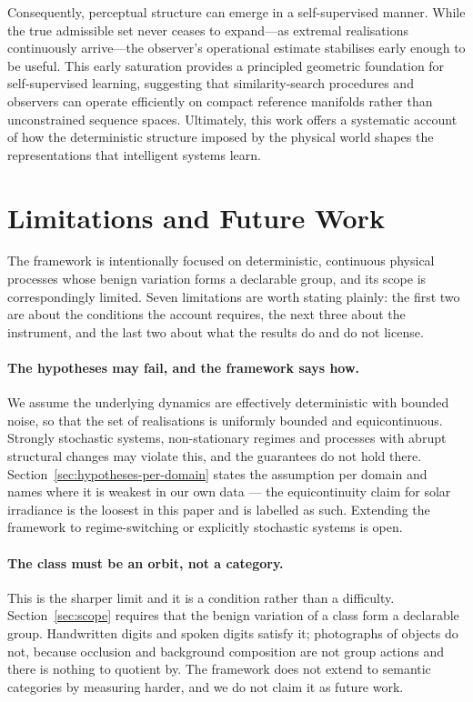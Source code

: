 \documentclass[10pt]{article}
\theoremstyle{plain}
\theoremstyle{definition}
\theoremstyle{remark}
\begin{document}
Consequently, perceptual structure can emerge in a self-supervised manner. While the true admissible set never ceases to expand---as extremal realisations continuously arrive---the observer's operational estimate stabilises early enough to be useful. This early saturation provides a principled geometric foundation for self-supervised learning, suggesting that similarity-search procedures and observers can operate efficiently on compact reference manifolds rather than unconstrained sequence spaces. Ultimately, this work offers a systematic account of how the deterministic structure imposed by the physical world shapes the representations that intelligent systems learn.

\section{Limitations and Future Work}
\label{sec:limitations}

The framework is intentionally focused on deterministic, continuous physical
processes whose benign variation forms a declarable group, and its scope is
correspondingly limited. Seven limitations are worth stating plainly: the first
two are about the conditions the account requires, the next three about the
instrument, and the last two about what the results do and do not license.

\paragraph{The hypotheses may fail, and the framework says how.}
We assume the underlying dynamics are effectively deterministic with bounded
noise, so that the set of realisations is uniformly bounded and equicontinuous.
Strongly stochastic systems, non-stationary regimes and processes with abrupt
structural changes may violate this, and the guarantees do not hold there.
Section~\ref{sec:hypotheses-per-domain} states the assumption per domain and
names where it is weakest in our own data --- the equicontinuity claim for solar
irradiance is the loosest in this paper and is labelled as such. Extending the
framework to regime-switching or explicitly stochastic systems is open.

\paragraph{The class must be an orbit, not a category.}
This is the sharper limit and it is a condition rather than a difficulty.
Section~\ref{sec:scope} requires that the benign variation of a class form a
declarable group. Handwritten digits and spoken digits satisfy it; photographs
of objects do not, because occlusion and background composition are not group
actions and there is nothing to quotient by. The framework does not extend to
semantic categories by measuring harder, and we do not claim it as future work.
\end{document}
